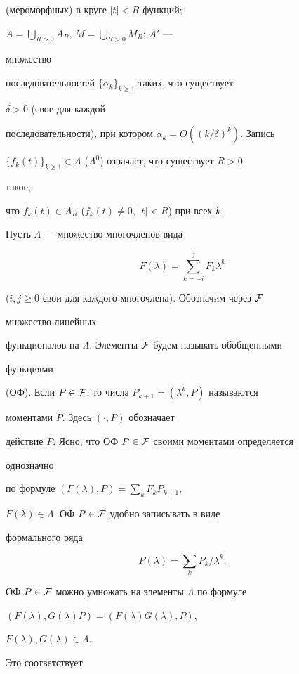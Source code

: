 (мероморфных) в круге $|t|<R$ функций; 


$A=\bigcup\limits_{R>0}A_R$, $M=\bigcup\limits_{R>0}M_R$; $A'$ --- 


множество 


последовательностей $\{\alpha_k\}_{k\ge 1}$ таких, что существует 


$\delta>0$ (свое для каждой 


последовательности), при котором $\alpha_k=O((k/\delta)^k)$. Запись 


$\{f_k(t)\}_{k\ge 1}\in A$ ($A^0$) означает, что существует $R>0$ 


такое, 


что $f_k(t)\in A_R$ ($f_k(t)\ne 0$, $|t|<R$) при всех $k$. 


 


Пусть $\Lambda$ --- множество многочленов вида 


$$ 


F(\lambda)=\sum^j_{k=-i}F_k\lambda^k 


$$ 


($i,j\ge 0$ свои для каждого многочлена). Обозначим через $\cal F$ 


множество линейных 


функционалов на $\Lambda$. Элементы $\cal F$ будем называть обобщенными 


функциями 


(ОФ). Если $P\in\cal F$, то числа $P_{k+1}=(\lambda^k,P)$ называются 


моментами $P$. Здесь $(\cdot,P)$ обозначает 


действие $P$. Ясно, что ОФ $P\in\cal F$ своими моментами определяется 


однозначно 


по формуле $(F(\lambda),P)=\sum\limits_k F_k P_{k+1}$, 


$F(\lambda)\in\Lambda$. ОФ $P\in\cal F$ удобно записывать в виде 


формального ряда 


$$ 


P(\lambda)=\sum_k P_k/\lambda^k. 


$$ 


ОФ $P\in\cal F$ можно умножать на элементы $\Lambda$ по формуле 


$(F(\lambda),G(\lambda)P)=(F(\lambda)G(\lambda),P)$, 


$F(\lambda),G(\lambda)\in\Lambda$. 


Это соответствует 


